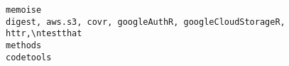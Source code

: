 \documentclass[
  letterpaper,
  DIV=11,
  numbers=noendperiod]{scrreprt}
\begin{document}
\begin{verbatim}
memoise                                                                                                                                                                                                                                                                                                                                                                                                                                                                                                                                                                                                                                                                                                                                                                                                                                                                                                                                                                                                                                                                                                                                                                                                                               digest, aws.s3, covr, googleAuthR, googleCloudStorageR, httr,\ntestthat
methods                                                                                                                                                                                                                                                                                                                                                                                                                                                                                                                                                                                                                                                                                                                                                                                                                                                                                                                                                                                                                                                                                                                                                                                                                                                                                             codetools

\end{verbatim}
\end{document}
